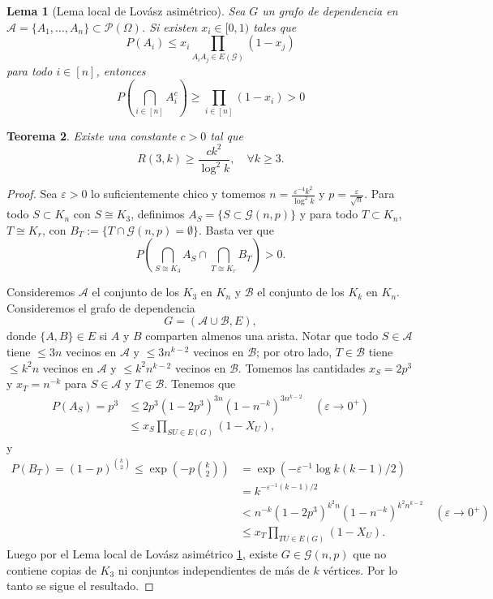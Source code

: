 \documentclass[12pt]{report}
\theoremstyle{plain}
\newtheorem{theorem}{Teorema}[section]
\newtheorem{lemma}[theorem]{Lema}
\theoremstyle{definition}
\begin{document}
\begin{lemma}[Lema local de Lovász asimétrico]\label{lema:lema local asimetrica}
Sea $G$ un grafo de dependencia en $\mathcal A = \{A_1, \ldots, A_n\} \subset \mathcal P (\Omega)$. Si existen $x_i \in [0, 1)$ tales que
\[
    P(A_i) \leq x_i \prod_{A_i A_j \in E(\mathcal G)} (1 - x_j)
\]
para todo $i \in [n]$, entonces
\[
    P (\bigcap_{i \in [n]} A_i^c) \geq \prod_{i \in [n]} (1-x_i) > 0
\]
\end{lemma}

\begin{theorem}
Existe una constante $c > 0$ tal que
\[
    R(3, k) \geq \frac{c k^2}{\log^2 k}, \quad \forall k \geq 3.
\]
\end{theorem}
\begin{proof}
Sea $\varepsilon > 0$ lo suficientemente chico y tomemos $n = \frac{\varepsilon^{-4} k ^2}{\log^2 k}$ y $p = \frac{\varepsilon}{\sqrt n}$. Para todo $S \subset K_n$ con $S \cong K_3$, definimos $A_S = \{ S \subset \mathcal G (n,p)\}$ y para todo $T \subset K_n$, $T \cong K_r$, con $B_T := \{ T \cap \mathcal G (n,p) = \emptyset\}$. Basta ver que
\[
    P (\bigcap_{S \cong K_3} A_S \cap \bigcap_{T \cong K_r} B_T) > 0.
\]

Consideremos $\mathcal A$ el conjunto de los $K_3$ en $K_n$ y $\mathcal B$ el conjunto de los $K_k$ en $K_n$. Consideremos el grafo de dependencia
\[
    G = ( \mathcal A \cup \mathcal B, E),
\]
donde $\{A, B\} \in E$ si $A$ y $B$ comparten almenos una arista. Notar que todo $S \in \mathcal A$ tiene $\leq 3n$ vecinos en $\mathcal A$ y $\leq 3n^{k-2}$ vecinos en $\mathcal B$; por otro lado, $T \in \mathcal B$ tiene $\leq k^2 n$ vecinos en $\mathcal A$ y $\leq k^2 n^{k-2}$ vecinos en $\mathcal B$. Tomemos las cantidades $x_S = 2p^3$ y $x_T = n^{-k}$ para $S \in \mathcal A$ y $T \in \mathcal B$. Tenemos que
\begin{align*}
P(A_S) = p^3 &\leq 2 p^3 (1-2p^3)^{3n} (1-n^{-k})^{3 n^{k-2}} \quad (\varepsilon \to 0^+)\\
&\leq x_S \prod_{S U \in E(G)} (1- X_U),
\end{align*}
y
\begin{align*}
    P(B_T) = (1-p)^{\binom k 2} \leq \exp \left (- p \binom k 2 \right ) &= \exp (- \varepsilon^{-1} \log k (k-1)/2) \\
    &= k^{-\varepsilon^{-1} (k-1)/2} \\
    &< n^{-k}(1-2 p^3)^{k^2n} (1- n^{-k})^{k^2 n^{k-2}} \quad (\varepsilon \to 0^+)\\
    &\leq x_T \prod_{T U \in E(G)} (1-X_U).
\end{align*}
Luego por el Lema local de Lovász asimétrico \ref{lema:lema local asimetrica}, existe $G \in \mathcal G (n,p)$ que no contiene copias de $K_3$ ni conjuntos independientes de más de $k$ vértices. Por lo tanto se sigue el resultado.
\end{proof}
\end{document}
